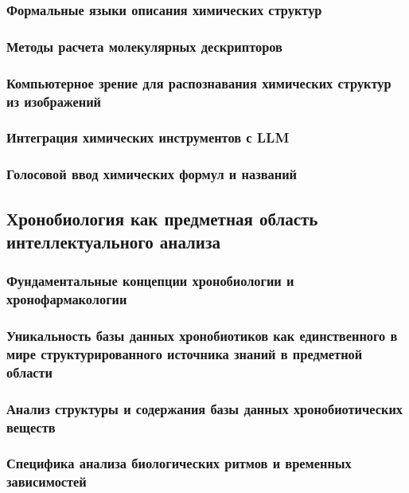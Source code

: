 \documentclass{syksu-coursework}
\begin{document}
\subsubsection{Формальные языки описания химических структур}

\subsubsection{Методы расчета молекулярных дескрипторов}

\subsubsection{Компьютерное зрение для распознавания химических структур из изображений}

\subsubsection{Интеграция химических инструментов с LLM}

\subsubsection{Голосовой ввод химических формул и названий}

\subsection{Хронобиология как предметная область интеллектуального анализа}

\subsubsection{Фундаментальные концепции хронобиологии и хронофармакологии}

\subsubsection{Уникальность базы данных хронобиотиков как единственного в мире структурированного источника знаний в предметной области}

\subsubsection{Анализ структуры и содержания базы данных хронобиотических веществ}

\subsubsection{Специфика анализа биологических ритмов и временных зависимостей}
\end{document}
